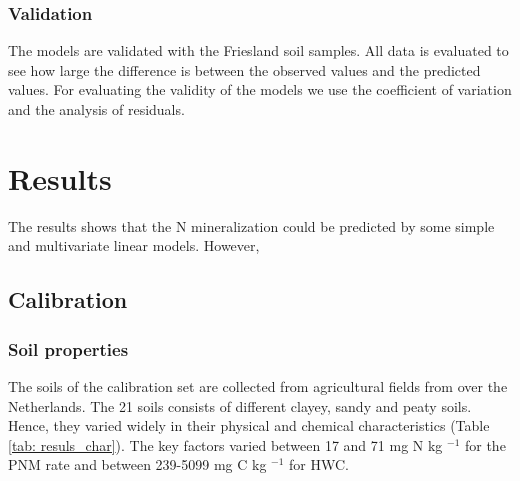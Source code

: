 \documentclass[10pt,twoside,dutch,english]{report}
\begin{document}
\subsection{Validation}
The models are validated with the Friesland soil samples. All data is evaluated to see how large the difference is between the observed values and the predicted values. For evaluating the validity of the models we use the coefficient of variation and the analysis of residuals. 






\chapter{Results}
The results shows that the N mineralization could be predicted by some simple and multivariate linear models. However, 
\section{Calibration}
\subsection{Soil properties}
The soils of the calibration set are collected from agricultural fields from over the Netherlands. The 21 soils consists of different clayey, sandy and peaty soils. Hence, they varied widely in their physical and chemical characteristics (Table \ref{tab: resuls_char}). The key factors varied between 17 and 71 mg N kg $^{-1}$ for the PNM rate and between 239-5099 mg C kg $^{-1}$ for HWC. 
\end{document}
